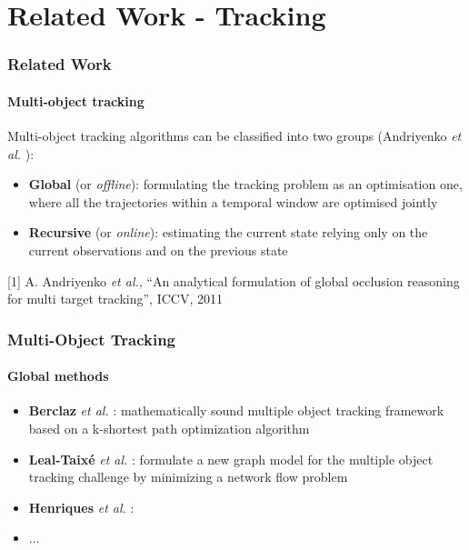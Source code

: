 \section{Related Work - Tracking}

\begin{frame}
	\frametitle{Related Work}
	\framesubtitle{Multi-object tracking}
	
	\Large
	
	\vspace{0.6cm}
	
	Multi-object tracking algorithms can be classified into two groups (Andriyenko \emph{et al.}
	\cite{Andriyenko11}):
	
	\begin{itemize}
		\item \textbf{Global} (or \emph{offline}): formulating the tracking problem as an optimisation
			  one, where all the trajectories within a temporal window are optimised jointly
		\item \textbf{Recursive} (or \emph{online}): estimating the current state relying only on the
			  current observations and on the previous state
	\end{itemize}
	
	\vspace{0.45cm}
	
	\tiny
	
	[1] A. Andriyenko \emph{et al.}, ``An analytical formulation of global occlusion reasoning for
		multi target tracking'', ICCV, 2011
\end{frame}

\begin{frame}
	\frametitle{Multi-Object Tracking}
	\framesubtitle{Global methods}
	
	\Large
	
	\vspace{0.2cm}
	
	\begin{itemize}
		\item \textbf{Berclaz} \emph{et al.} \cite{Berclaz11}: mathematically sound
			  multiple object tracking framework based on a k-shortest path optimization
			  algorithm
		\vspace{0.1cm}
		\item \textbf{Leal-Taix{\'e}} \emph{et al.} \cite{Leal11}: formulate a new graph
			  model for the multiple object tracking challenge by minimizing a network flow
			  problem
		\vspace{0.1cm}
		\item \textbf{Henriques} \emph{et al.} \cite{Henriques11}: 
		\vspace{0.1cm}
		\item ...
	\end{itemize}
\end{frame}

